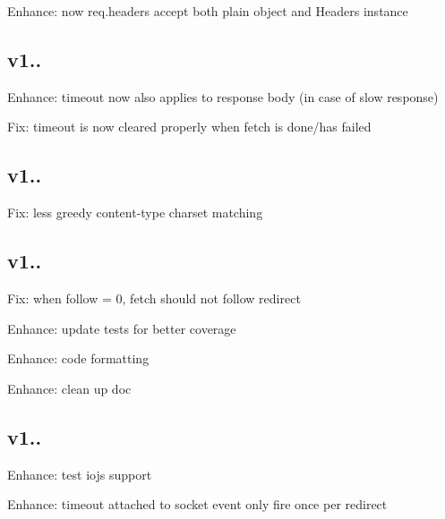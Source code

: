 \begin{DoxyItemize}
\item Enhance\+: now req.\+headers accept both plain object and {\ttfamily Headers} instance
\end{DoxyItemize}

\subsection*{v1..}


\begin{DoxyItemize}
\item Enhance\+: timeout now also applies to response body (in case of slow response)
\item Fix\+: timeout is now cleared properly when fetch is done/has failed
\end{DoxyItemize}

\subsection*{v1..}


\begin{DoxyItemize}
\item Fix\+: less greedy content-\/type charset matching
\end{DoxyItemize}

\subsection*{v1..}


\begin{DoxyItemize}
\item Fix\+: when {\ttfamily follow = 0}, fetch should not follow redirect
\item Enhance\+: update tests for better coverage
\item Enhance\+: code formatting
\item Enhance\+: clean up doc
\end{DoxyItemize}

\subsection*{v1..}


\begin{DoxyItemize}
\item Enhance\+: test iojs support
\item Enhance\+: timeout attached to socket event only fire once per redirect
\end{DoxyItemize}

